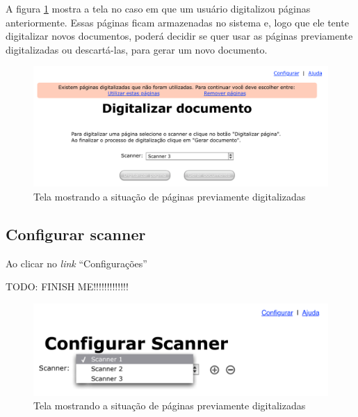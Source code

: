 A figura \ref{fig:dig_8} mostra a tela no caso em que um usuário digitalizou páginas anteriormente. Essas páginas ficam armazenadas no sistema e, logo que ele tente digitalizar novos documentos, poderá decidir se quer usar as páginas previamente digitalizadas ou descartá-las, para gerar um novo documento.

\begin{figure}[h]
 \centering
  \includegraphics[scale=0.6]{img/mockups/digitalizacao-8.pdf}
  \caption {Tela mostrando a situação de páginas previamente digitalizadas}
  \label{fig:dig_8}
\end{figure}



\subsection{Configurar scanner}
\label{sec:mockups_configurar}

Ao clicar no {\it link} ``Configurações''

TODO: FINISH ME!!!!!!!!!!!!!

\begin{figure}[h]
 \centering
  \includegraphics[scale=0.6]{img/mockups/config-1.pdf}
  \caption {Tela mostrando a situação de páginas previamente digitalizadas}
  \label{fig:config_1}
\end{figure}

